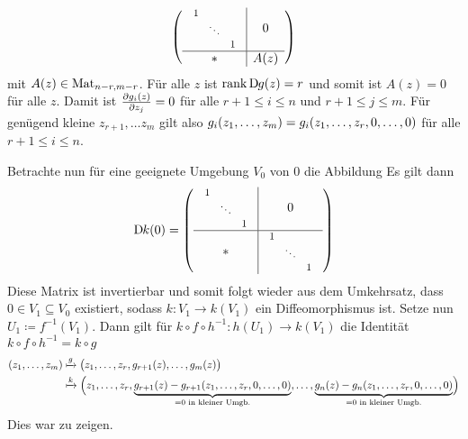 \begin{beweis}
\[		%
		\enbrace*{\begin{array}{c|c}
			\scalebox{.8}{$\begin{array}{ccc}
				1 & & \\
				& \ddots & \\
				& & 1
			\end{array}$} & 0 \\ \hline
			* & A(z)
		\end{array}}
	\]
	mit $A(z) \in \Mat_{n-r,m-r}$.
	Für alle $z$ ist $\rank \D g(z) = r$ und somit ist $A(z) = 0$ für alle $z$.
	Damit ist $\diff{g_i(z)}{z_j} = 0$ für alle $r +1 \le i \le n$ und $r+1 \le j \le m$.
	Für genügend kleine $z_{r+1}, \ldots z_m$ gilt also $g_i(z_1, \ldots ,z_m) = g_i \enbrace*{z_1, \ldots , z_r,0, \ldots ,0}$ für alle $r +1 \le i \le n$.
	
	Betrachte nun für eine geeignete Umgebung $V_0$ von 0 die Abbildung
	Es gilt dann
	\[
		\D k (0) = 
		\enbrace*{\begin{array}{c|c}
			\scalebox{.8}{$\begin{array}{ccc}
				1 & & \\
				& \ddots & \\
				& & 1
			\end{array}$} & 0 \\ \hline
			* & \scalebox{.8}{$\begin{array}{ccc}
				1 & & \\
				& \ddots & \\
				& & 1
			\end{array}$}
		\end{array}}
	\]
	Diese Matrix ist invertierbar und somit folgt wieder aus dem Umkehrsatz, dass $0 \in V_1 \subseteq V_0$ existiert, sodass $k \colon V_1 \to k(V_1)$ ein Diffeomorphismus ist.
	Setze nun $U_1 \coloneqq f^{-1}(V_1)$.
	Dann gilt für $k \circ f \circ h^{-1} \colon h(U_1) \to k(V_1)$ die Identität $k \circ f \circ h^{-1} = k \circ g$
	\begin{align}
		(z_1, \ldots ,z_m) &\xmapsto{g} \enbrace[\big]{z_1, \ldots ,z_r, g_{r+1}(z), \ldots , g_m(z)}  \\
		&\xmapsto{k} \enbrace[\Big]{z_1, \ldots ,z_r, \Underbrace{g_{r+1}(z) - g_{r+1}(z_1, \ldots ,z_r, 0, \ldots ,0)}{=0 \text{ in kleiner Umgb.}}, \ldots , \Underbrace{g_n(z) - g_n(z_1, \ldots ,z_r,0,\ldots ,0)}{=0 \text{ in kleiner Umgb.}}}
	\end{align}
	Dies war zu zeigen.
\end{beweis}


